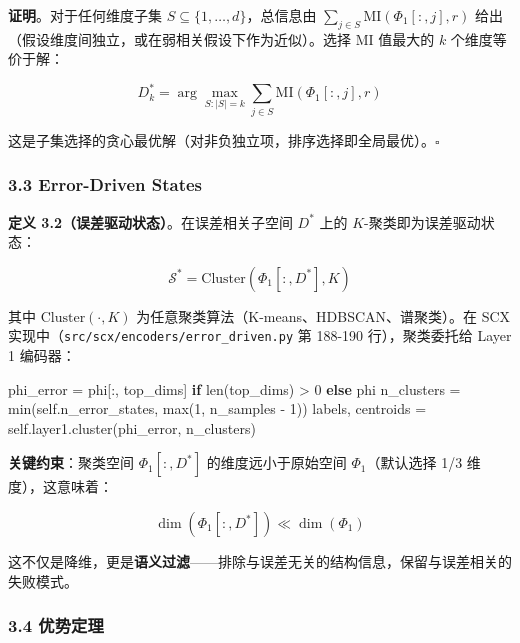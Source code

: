 \documentclass[
  12pt,
]{ctexart}
\newenvironment{Shaded}{}{}
\newcommand{\BuiltInTok}[1]{\textcolor[rgb]{0.00,0.50,0.00}{#1}}
\newcommand{\ControlFlowTok}[1]{\textcolor[rgb]{0.00,0.44,0.13}{\textbf{#1}}}
\newcommand{\DecValTok}[1]{\textcolor[rgb]{0.25,0.63,0.44}{#1}}
\newcommand{\NormalTok}[1]{#1}
\newcommand{\OperatorTok}[1]{\textcolor[rgb]{0.40,0.40,0.40}{#1}}
\newcommand{\VariableTok}[1]{\textcolor[rgb]{0.10,0.09,0.49}{#1}}
\begin{document}
\textbf{证明}。对于任何维度子集 \(S \subseteq \{1,\dots,d\}\)，总信息由
\(\sum_{j \in S} \text{MI}(\Phi_1[:, j], r)\)
给出（假设维度间独立，或在弱相关假设下作为近似）。选择 \(\text{MI}\)
值最大的 \(k\) 个维度等价于解：

\[D^*_k = \arg\max_{S: |S|=k} \sum_{j \in S} \text{MI}(\Phi_1[:, j], r)\]

这是子集选择的贪心最优解（对非负独立项，排序选择即全局最优）。\(\square\)

\subsubsection{3.3 Error-Driven States}\label{error-driven-states}

\textbf{定义 3.2（误差驱动状态）}。在误差相关子空间 \(D^*\) 上的
\(K\)-聚类即为误差驱动状态：

\[\mathcal{S}^* = \text{Cluster}(\Phi_1[:, D^*], K)\]

其中 \(\text{Cluster}(\cdot, K)\)
为任意聚类算法（K-means、HDBSCAN、谱聚类）。在 SCX
实现中（\texttt{src/scx/encoders/error\_driven.py} 第 188-190
行），聚类委托给 Layer 1 编码器：

\begin{Shaded}
\begin{Highlighting}[]
\NormalTok{phi\_error }\OperatorTok{=}\NormalTok{ phi[:, top\_dims] }\ControlFlowTok{if} \BuiltInTok{len}\NormalTok{(top\_dims) }\OperatorTok{\textgreater{}} \DecValTok{0} \ControlFlowTok{else}\NormalTok{ phi}
\NormalTok{n\_clusters }\OperatorTok{=} \BuiltInTok{min}\NormalTok{(}\VariableTok{self}\NormalTok{.n\_error\_states, }\BuiltInTok{max}\NormalTok{(}\DecValTok{1}\NormalTok{, n\_samples }\OperatorTok{{-}} \DecValTok{1}\NormalTok{))}
\NormalTok{labels, centroids }\OperatorTok{=} \VariableTok{self}\NormalTok{.layer1.cluster(phi\_error, n\_clusters)}
\end{Highlighting}
\end{Shaded}

\textbf{关键约束}：聚类空间 \(\Phi_1[:, D^*]\) 的维度远小于原始空间
\(\Phi_1\)（默认选择 1/3 维度），这意味着：

\[\dim(\Phi_1[:, D^*]) \ll \dim(\Phi_1)\]

这不仅是降维，更是\textbf{语义过滤}------排除与误差无关的结构信息，保留与误差相关的失败模式。

\subsubsection{3.4 优势定理}\label{ux4f18ux52bfux5b9aux7406}
\end{document}
